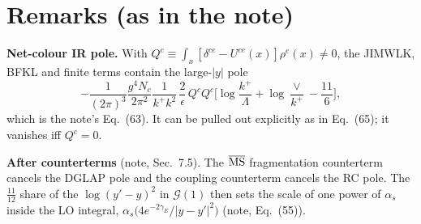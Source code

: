 \documentclass[10pt]{article}
\begin{document}
\section*{Remarks (as in the note)}
\textbf{Net-colour IR pole.} With $Q^c\equiv\int_x[\delta^{ce}-U^{ce}(x)]\rho^e(x)\neq0$, the JIMWLK, BFKL and finite
terms contain the large-$|y|$ pole
\begin{equation}
-\frac{1}{(2\pi)^3}\frac{g^4N_c}{2\pi^2}\frac{1}{k^+k^2}\,\frac{2}{\epsilon}\,Q^cQ^c\Big[\log\frac{k^+}{\Lambda}+\log\frac{\vee}{k^+}-\frac{11}{6}\Big],
\end{equation}
which is the note's Eq.~(63). It can be pulled out explicitly as in Eq.~(65); it vanishes iff $Q^c=0$.

\textbf{After counterterms} (note, Sec.~7.5). The $\overline{\rm MS}$ fragmentation counterterm cancels the DGLAP
pole and the coupling counterterm cancels the RC pole. The $\frac{11}{12}$ share of the $\log(y'-y)^2$
in $\mathcal G(1)$ then sets the scale of one power of $\alpha_s$ inside the LO integral,
$\alpha_s\big(4e^{-2\gamma_E}/|y-y'|^2\big)$ (note, Eq.~(55)).
\end{document}
